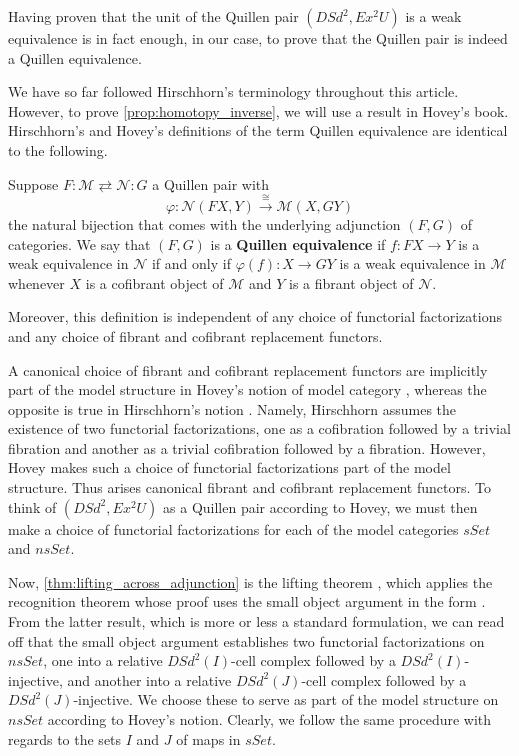 \noindent Having proven that the unit of the Quillen pair $(DSd^2,Ex^2U)$ is a weak equivalence is in fact enough, in our case, to prove that the Quillen pair is indeed a Quillen equivalence.

We have so far followed Hirschhorn's terminology throughout this article. However, to prove \cref{prop:homotopy_inverse}, we will use a result in Hovey's book. Hirschhorn's and Hovey's definitions of the term Quillen equivalence are identical to the following.
\begin{definition}
Suppose $F:\mathscr{M} \rightleftarrows \mathscr{N} :G$ a Quillen pair with
\[\varphi :\mathscr{N} (FX,Y)\xrightarrow{\cong } \mathscr{M} (X,GY)\]
the natural bijection that comes with the underlying adjunction $(F,G)$ of categories. We say that $(F,G)$ is a \textbf{Quillen equivalence} if $f:FX\to Y$ is a weak equivalence in $\mathscr{N}$ if and only if $\varphi (f):X\to GY$ is a weak equivalence in $\mathscr{M}$ whenever $X$ is a cofibrant object of $\mathscr{M}$ and $Y$ is a fibrant object of $\mathscr{N}$.
\end{definition}
\noindent Moreover, this definition is independent of any choice of functorial factorizations and any choice of fibrant and cofibrant replacement functors.

A canonical choice of fibrant and cofibrant replacement functors are implicitly part of the model structure in Hovey's notion of model category \cite[Def.~1.1.3, p.~3]{Ho99}, whereas the opposite is true in Hirschhorn's notion \cite[Def.~7.1.3, p.~109]{Hi03}. Namely, Hirschhorn assumes the existence of two functorial factorizations, one as a cofibration followed by a trivial fibration and another as a trivial cofibration followed by a fibration. However, Hovey makes such a choice of functorial factorizations part of the model structure. Thus arises canonical fibrant and cofibrant replacement functors. To think of $(DSd^2,Ex^2U)$ as a Quillen pair according to Hovey, we must then make a choice of functorial factorizations for each of the model categories $sSet$ and $nsSet$.

Now, \cref{thm:lifting_across_adjunction} is the lifting theorem \cite[Thm.~11.3.2]{Hi03}, which applies the recognition theorem \cite[Thm.~11.3.1]{Hi03} whose proof uses the small object argument in the form \cite[Prop.~10.5.16]{Hi03}. From the latter result, which is more or less a standard formulation, we can read off that the small object argument establishes two functorial factorizations on $nsSet$, one into a relative $DSd^2(I)$-cell complex followed by a $DSd^2(I)$-injective, and another into a relative $DSd^2(J)$-cell complex followed by a $DSd^2(J)$-injective. We choose these to serve as part of the model structure on $nsSet$ according to Hovey's notion. Clearly, we follow the same procedure with regards to the sets $I$ and $J$ of maps in $sSet$.

